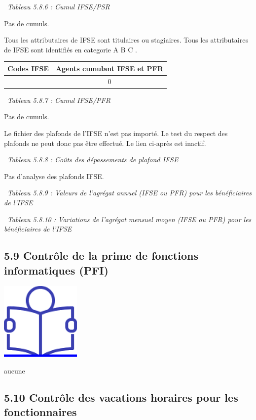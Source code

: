 ~\emph{Tableau 5.8.6 : Cumul IFSE/PSR}

Pas de cumuls.

Tous les attributaires de IFSE sont titulaires ou stagiaires. Tous les
attributaires de IFSE sont identifiés en categorie A B C .

\begin{longtable}[]{@{}cc@{}}
\toprule
Codes IFSE & Agents cumulant IFSE et PFR\tabularnewline
\midrule
\endhead
& 0\tabularnewline
\bottomrule
\end{longtable}

~\emph{Tableau 5.8.7 : Cumul IFSE/PFR}

Pas de cumuls.

Le fichier des plafonds de l'IFSE n'est pas importé. Le test du respect
des plafonds ne peut donc pas être effectué. Le lien ci-après est
inactif.

~\emph{Tableau 5.8.8 : Coûts des dépassements de plafond IFSE}

Pas d'analyse des plafonds IFSE.

~\emph{Tableau 5.8.9 : Valeurs de l'agrégat annuel (IFSE ou PFR) pour
les bénéficiaires de l'IFSE}

~\emph{Tableau 5.8.10 : Variations de l'agrégat mensuel moyen (IFSE ou
PFR) pour les bénéficiaires de l'IFSE}

\hypertarget{controle-de-la-prime-de-fonctions-informatiques-pfi}{%
\subsection{5.9 Contrôle de la prime de fonctions informatiques
(PFI)}\label{controle-de-la-prime-de-fonctions-informatiques-pfi}}

\href{../Docs/Notices/fiche_PFI.odt}{\includegraphics{icones/Notice.png}}

aucune

\hypertarget{controle-des-vacations-horaires-pour-les-fonctionnaires}{%
\subsection{5.10 Contrôle des vacations horaires pour les
fonctionnaires}\label{controle-des-vacations-horaires-pour-les-fonctionnaires}}

